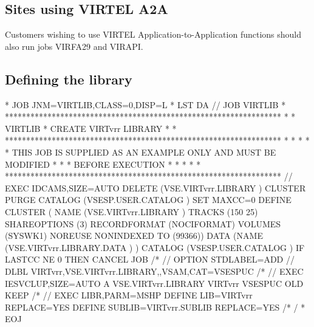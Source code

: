 \documentclass[letterpaper,10pt,english]{sphinxmanual}
\begin{document}
\subsection{Sites using VIRTEL A2A}
\label{\detokenize{Installation_Guide:sites-using-virtel-a2a}}
Customers wishing to use VIRTEL Application-to-Application functions should also run jobs VIRFA29 and VIRAPI.


\subsection{Defining the library}
\label{\detokenize{Installation_Guide:defining-the-library}}
\begin{sphinxVerbatim}[commandchars=\\\{\}]
* \PYGZdl{}\PYGZdl{} JOB JNM=VIRTLIB,CLASS=0,DISP=L
* \PYGZdl{}\PYGZdl{} LST DA
// JOB VIRTLIB
* *****************************************************************
* * VIRTLIB * CREATE VIRTvrr LIBRARY                              *
* *****************************************************************
* *                                                               *
* * THIS JOB IS SUPPLIED AS AN EXAMPLE ONLY AND MUST BE MODIFIED  *
* * BEFORE EXECUTION                                              *
* *                                                               *
* *****************************************************************
// EXEC IDCAMS,SIZE=AUTO
 DELETE (VSE.VIRTvrr.LIBRARY ) \PYGZhy{}
          CLUSTER \PYGZhy{}
          PURGE \PYGZhy{}
    CATALOG (VSESP.USER.CATALOG )
 SET MAXCC=0
 DEFINE CLUSTER ( \PYGZhy{}
            NAME (VSE.VIRTvrr.LIBRARY ) \PYGZhy{}
            TRACKS (150 25) \PYGZhy{}
            SHAREOPTIONS (3) \PYGZhy{}
            RECORDFORMAT (NOCIFORMAT) \PYGZhy{}
            VOLUMES (SYSWK1) \PYGZhy{}
            NOREUSE \PYGZhy{}
            NONINDEXED \PYGZhy{}
            TO (99366)) \PYGZhy{}
            DATA (NAME (VSE.VIRTvrr.LIBRARY.DATA ) ) \PYGZhy{}
            CATALOG (VSESP.USER.CATALOG )
 IF LASTCC NE 0 THEN CANCEL JOB
/*
// OPTION STDLABEL=ADD
// DLBL VIRTvrr,\PYGZsq{}VSE.VIRTvrr.LIBRARY\PYGZsq{},,VSAM,CAT=VSESPUC
/*
// EXEC IESVCLUP,SIZE=AUTO
A VSE.VIRTvrr.LIBRARY        VIRTvrr VSESPUC OLD KEEP
/*
// EXEC LIBR,PARM=\PYGZsq{}MSHP\PYGZsq{}
              DEFINE LIB=VIRTvrr REPLACE=YES
              DEFINE SUBLIB=VIRTvrr.SUBLIB REPLACE=YES
/*
/\PYGZam{}
* \PYGZdl{}\PYGZdl{} EOJ
\end{sphinxVerbatim}

\end{document}

